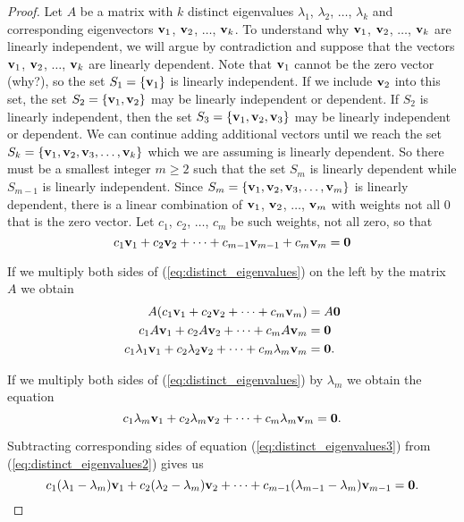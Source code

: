 \begin{proof} Let $A$ be a matrix with $k$ distinct eigenvalues $\lambda_1$, $\lambda_2$, $\ldots$, $\lambda_k$ and corresponding eigenvectors $\mathbf{v}_1$, $\mathbf{v}_2$, $\ldots$, $\mathbf{v}_k$. To understand why $\mathbf{v}_1$, $\mathbf{v}_2$, $\ldots$, $\mathbf{v}_k$ are linearly independent, we will argue by contradiction and suppose that the vectors $\mathbf{v}_1$, $\mathbf{v}_2$, $\ldots$, $\mathbf{v}_k$ are linearly dependent. Note that $\mathbf{v}_1$ cannot be the zero vector (why?), so the set $S_1=\{\mathbf{v}_1\}$ is linearly independent. If we include $\mathbf{v}_2$ into this set, the set $S_2 = \{\mathbf{v}_1, \mathbf{v}_2\}$ may be linearly independent or dependent. If $S_2$ is linearly independent, then the set $S_3 = \{\mathbf{v}_1, \mathbf{v}_2, \mathbf{v}_3\}$ may be linearly independent or dependent. We can continue adding additional vectors until we reach the set $S_k = \{\mathbf{v}_1, \mathbf{v}_2, \mathbf{v}_3, \ldots, \mathbf{v}_k\}$ which we are assuming is linearly dependent. So there must be a smallest integer $m \geq 2$ such that the set $S_m$ is linearly dependent while $S_{m-1}$ is linearly independent. Since $S_m = \{\mathbf{v}_1, \mathbf{v}_2, \mathbf{v}_3, \ldots, \mathbf{v}_m\}$ is linearly dependent, there is a linear combination of $\mathbf{v}_1$, $\mathbf{v}_2$, $\ldots$, $\mathbf{v}_m$ with weights not all 0 that is the zero vector. Let $c_1$, $c_2$, $\ldots$, $c_m$ be such weights, not all zero, so that
\begin{equation}
c_1\mathbf{v}_1 + c_2\mathbf{v}_2 + \cdots + c_{m-1} \mathbf{v}_{m-1} + c_m \mathbf{v}_m = \mathbf{0} \label{eq:distinct_eigenvalues}
\end{equation}

If we multiply both sides of (\ref{eq:distinct_eigenvalues}) on the left by the matrix $A$ we obtain
\begin{align}
A(c_1\mathbf{v}_1 + c_{2}\mathbf{v}_{2} + \cdots + c_m \mathbf{v}_m) &= A\mathbf{0} \notag \\
c_1A\mathbf{v}_1 + c_{2}A\mathbf{v}_{2} + \cdots + c_m A\mathbf{v}_m &= \mathbf{0} \notag \\
c_1 \lambda_1\mathbf{v}_1 + c_{2}\lambda_{2}\mathbf{v}_{2} + \cdots + c_m \lambda_m\mathbf{v}_m &= \mathbf{0}. \label{eq:distinct_eigenvalues2}
\end{align}

If we multiply both sides of (\ref{eq:distinct_eigenvalues}) by $\lambda_m$ we obtain the equation
\begin{equation}
c_1\lambda_m\mathbf{v}_1 + c_{2}\lambda_m\mathbf{v}_{2} + \cdots + c_m \lambda_m\mathbf{v}_m = \mathbf{0}. \label{eq:distinct_eigenvalues3}
\end{equation}

Subtracting corresponding sides of equation (\ref{eq:distinct_eigenvalues3}) from (\ref{eq:distinct_eigenvalues2}) gives us
\begin{equation}
c_{1}(\lambda_{1}-\lambda_m)\mathbf{v}_{1} + c_{2}(\lambda_{2}-\lambda_m)\mathbf{v}_{2} + \cdots + c_{m-1} (\lambda_{m-1}-\lambda_m) \mathbf{v}_{m-1} = \mathbf{0}. \label{eq:distinct_eigenvalues4}
\end{equation}


\end{proof}
